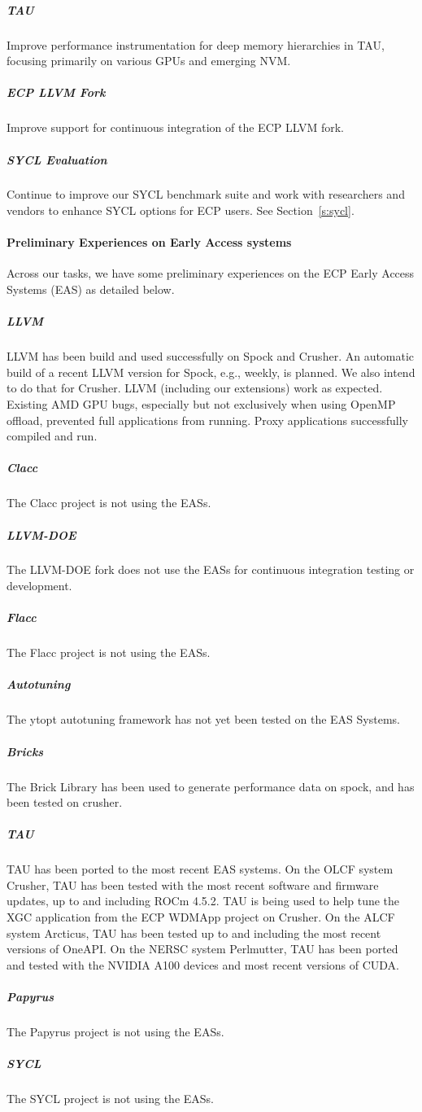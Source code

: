     \subparagraph{TAU} Improve performance instrumentation for deep memory hierarchies in TAU, focusing primarily on various GPUs and emerging NVM.
    
    \subparagraph{ECP LLVM Fork} Improve support for continuous integration of the ECP LLVM fork.

    \subparagraph{SYCL Evaluation} 
    Continue to improve our SYCL benchmark suite and work with researchers and vendors to enhance SYCL options for ECP users. See Section~\ref{s:sycl}.



\paragraph{Preliminary Experiences on Early Access systems}

Across our tasks, we have some preliminary experiences on the ECP Early Access Systems (EAS) as detailed below.


    \subparagraph{LLVM}
    LLVM has been build and used successfully on Spock and Crusher.
    An automatic build of a recent LLVM version for Spock, e.g., weekly, is
    planned. We also intend to do that for Crusher. LLVM (including our 
    extensions) work as expected. Existing AMD GPU bugs, especially but not exclusively 
    when using OpenMP offload, prevented full applications from running.
    Proxy applications successfully compiled and run.
    
    \subparagraph{Clacc}
    The Clacc project is not using the EASs. 
    
    \subparagraph{LLVM-DOE}
    The LLVM-DOE fork does not use the EASs for continuous integration testing or development.
    
    \subparagraph{Flacc}
    The Flacc project is not using the EASs. 
    
    \subparagraph{Autotuning}
    The ytopt autotuning framework has not yet been tested on the EAS Systems.
    
    \subparagraph{Bricks}
    The Brick Library has been used to generate performance data on spock, and has been tested on crusher.
    
    \subparagraph{TAU}
    TAU has been ported to the most recent EAS systems.  On the OLCF system Crusher,
    TAU has been tested with the most recent software and firmware updates, up to
    and including ROCm 4.5.2.  TAU is being used to help tune the XGC application
    from the ECP WDMApp project on Crusher.  On the ALCF system Arcticus, TAU has 
    been tested up to and including the most recent versions of OneAPI.  On the 
    NERSC system Perlmutter, TAU has been ported and tested with the NVIDIA A100 
    devices and most recent versions of CUDA.
    
    \subparagraph{Papyrus}
    The Papyrus project is not using the EASs. 
    
    \subparagraph{SYCL}
    The SYCL project is not using the EASs. 
    




